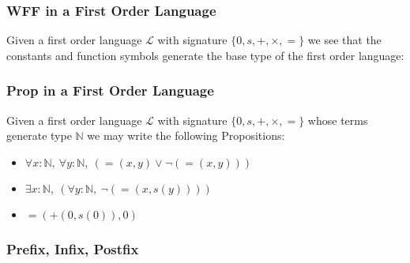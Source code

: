 \documentclass{beamer}
\theoremstyle{indentDefn} \newtheorem{defn}[]{Definition}
\begin{document}
\begin{frame}
	\frametitle{WFF in a First Order Language}
	
	Given a first order language $\mathcal{L}$ with signature $\{0,s,+,\times,=\}$ we see that the constants and function symbols generate the base type of the first order language: 
	
	\vspace{60mm}

		
\end{frame}

\begin{frame}
	\frametitle{Prop in a First Order Language}
	
	Given a first order language $\mathcal{L}$ with signature $\{0,s,+,\times,=\}$ whose terms generate type $\mathbb{N}$ we may write the following Propositions:
	
	\begin{itemize}
		\item  $\forall x : \mathbb{N}, \ \forall y : \mathbb{N}, \ (=(x,y) \lor \lnot(=(x,y)))$
		\item  $\exists x : \mathbb{N}, \ (\forall y : \mathbb{N}, \ \lnot(=(x,s(y))))$
		\item $=(+(0,s(0)),0)$
	\end{itemize}
	
	\vspace{40mm}
\end{frame}

\begin{frame}
	\frametitle{Prefix, Infix, Postfix}
\end{frame}
\end{document}
